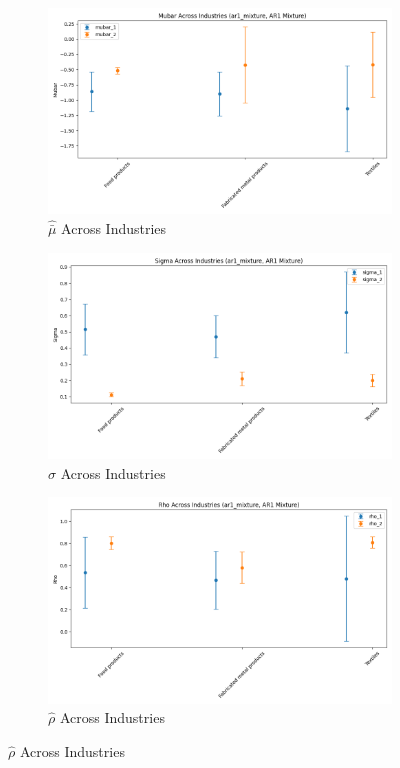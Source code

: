 \documentclass{article}
\begin{document}
\begin{figure}[ht!]
\begin{subfigure}[t]{0.32\textwidth}
        \includegraphics[width=\textwidth]{figure/ar1_mixture_mubar_across_industries.png}
        \caption{$\hat{\bar\mu}$ Across Industries}
    \end{subfigure}
    \begin{subfigure}[t]{0.32\textwidth}
        \centering
        \includegraphics[width=\textwidth]{figure/ar1_mixture_sigma_across_industries.png}
        \caption{$\hat\sigma$ Across Industries}
    \end{subfigure}
    \begin{subfigure}[t]{0.32\textwidth}
        \centering
        \includegraphics[width=\textwidth]{figure/ar1_mixture_rho_across_industries.png}
        \caption{$\hat\rho$ Across Industries}
    \end{subfigure}
\end{figure}
\end{document}
